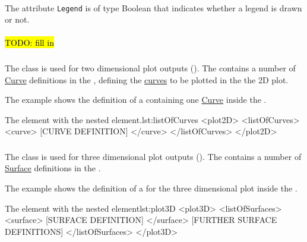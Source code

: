 \paragraph*{}
The attribute {\tt Legend} is of type Boolean that indicates whether a legend is drawn or not. 

\paragraph*{}
\hl{TODO: fill in}

\subsubsection{}
\label{class:plot2D}
The  class is used for two dimensional plot outputs (). The  contains a number of \hyperref[class:curve]{Curve} definitions in the , defining the \hyperref[class:curve]{curves} to be plotted in the the 2D plot.

The example shows the definition of a  containing one \hyperref[class:curve]{Curve} inside the .
\begin{myXmlLst}{The  element with the nested  element.}{lst:listOfCurves}
<plot2D>
	<listOfCurves>
		<curve>
			[CURVE DEFINITION]
		</curve>
	</listOfCurves>
</plot2D>
\end{myXmlLst}


\subsubsection{}
\label{class:plot3D}
The  class is used for three dimensional plot outputs (). The  contains a number of \hyperref[class:surface]{Surface} definitions in the . 

The example shows the definition of a \hyperref[class:surface]{} for the three dimensional plot inside the .
\begin{myXmlLst}{The  element with the nested  element}{lst:plot3D}
<plot3D>
	<listOfSurfaces>
		<surface> 
			[SURFACE DEFINITION]
		</surface>
		[FURTHER SURFACE DEFINITIONS]
	</listOfSurfaces>
</plot3D>
\end{myXmlLst}


